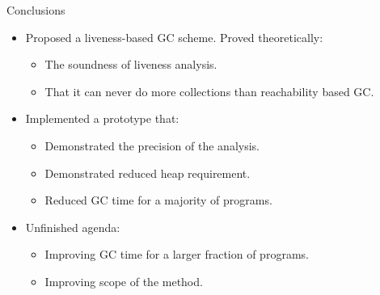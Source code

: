 \documentclass[xcolor=x11names,compress,mathserif]{beamer}
\renewcommand{\(}{\begin{columns}}
\renewcommand{\)}{\end{columns}}
\newcommand{\<}[1]{\begin{column}{#1}}
\renewcommand{\>}{\end{column}}
\begin{document}
\begin{frame}{Conclusions}
  \begin{itemize}\itemsep1em
  \item Proposed a liveness-based GC scheme. Proved theoretically:
    \begin{itemize}
    \item The soundness of liveness analysis.
    \item That it can never do more collections than reachability
      based GC.
    \end{itemize}
    \item Implemented a prototype that:
      \begin{itemize}
      \item Demonstrated the precision of the analysis.
      \item Demonstrated reduced heap requirement.
      \item Reduced GC time for a majority of programs.
    \end{itemize}
    \item Unfinished agenda:
      \begin{itemize}
      \item Improving GC time for a larger fraction of programs.
      \item Improving scope of the method.
    \end{itemize}
  \end{itemize}
\end{frame}
\end{document}

